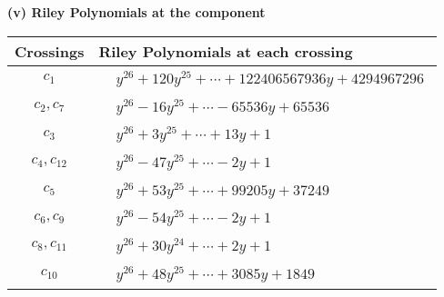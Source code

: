 \documentclass[1p]{elsarticle_modified}
\theoremstyle{definition}
\begin{document}
\newpage\renewcommand{\arraystretch}{1}
\flushleft \textbf{(v) Riley Polynomials at the component}\newline \\
\begin{tabular}{m{50pt}|m{274pt}}
Crossings & \hspace{64pt}Riley Polynomials at each crossing \\
\hline $$\begin{aligned}c_{1}\end{aligned}$$&$\begin{aligned}
&y^{26}+120 y^{25}+\cdots+122406567936 y+4294967296
\end{aligned}$\\
\hline $$\begin{aligned}c_{2},c_{7}\end{aligned}$$&$\begin{aligned}
&y^{26}-16 y^{25}+\cdots-65536 y+65536
\end{aligned}$\\
\hline $$\begin{aligned}c_{3}\end{aligned}$$&$\begin{aligned}
&y^{26}+3 y^{25}+\cdots+13 y+1
\end{aligned}$\\
\hline $$\begin{aligned}c_{4},c_{12}\end{aligned}$$&$\begin{aligned}
&y^{26}-47 y^{25}+\cdots-2 y+1
\end{aligned}$\\
\hline $$\begin{aligned}c_{5}\end{aligned}$$&$\begin{aligned}
&y^{26}+53 y^{25}+\cdots+99205 y+37249
\end{aligned}$\\
\hline $$\begin{aligned}c_{6},c_{9}\end{aligned}$$&$\begin{aligned}
&y^{26}-54 y^{25}+\cdots-2 y+1
\end{aligned}$\\
\hline $$\begin{aligned}c_{8},c_{11}\end{aligned}$$&$\begin{aligned}
&y^{26}+30 y^{24}+\cdots+2 y+1
\end{aligned}$\\
\hline $$\begin{aligned}c_{10}\end{aligned}$$&$\begin{aligned}
&y^{26}+48 y^{25}+\cdots+3085 y+1849
\end{aligned}$\\
\hline
\end{tabular}\\~\\
\end{document}
